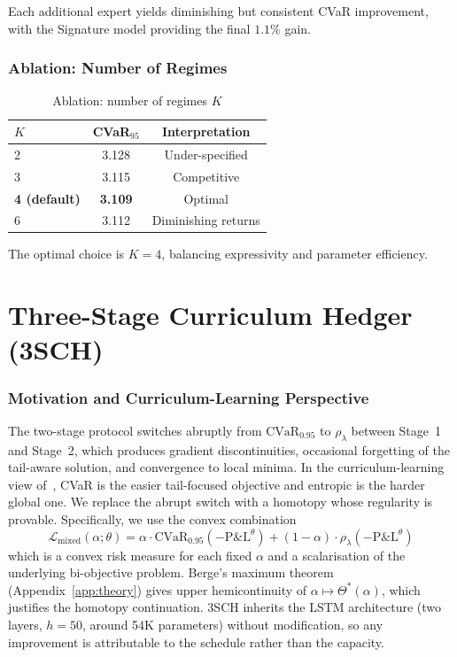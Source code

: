 \documentclass[11pt,oneside]{report}
\newcommand{\cvar}{\mathrm{CVaR}}
\begin{document}
Each additional expert yields diminishing but consistent CVaR improvement, with the Signature model providing the final $1.1\%$ gain.


\subsubsection{Ablation: Number of Regimes}

\begin{table}[htbp]
\centering
\caption{Ablation: number of regimes $K$}
\label{tab:ablation_regimes}
\small
\begin{tabular}{lcc}
\toprule
\textbf{$K$} & \textbf{CVaR$_{95}$} & \textbf{Interpretation} \\
\midrule
2 & 3.128 & Under-specified \\
3 & 3.115 & Competitive \\
\textbf{4 (default)} & \textbf{3.109} & Optimal \\
6 & 3.112 & Diminishing returns \\
\bottomrule
\end{tabular}
\end{table}

The optimal choice is $K=4$, balancing expressivity and parameter efficiency.


\section{Three-Stage Curriculum Hedger (3SCH)}
\label{sec:3sch}

\subsubsection{Motivation and Curriculum-Learning Perspective}

The two-stage \citet{kozyra2019deep} protocol switches abruptly from $\cvar_{0.95}$ to $\rho_\lambda$ between Stage~1 and Stage~2, which produces gradient discontinuities, occasional forgetting of the tail-aware solution, and convergence to local minima. In the curriculum-learning view of~\citet{bengio2009curriculum}, CVaR is the easier tail-focused objective and entropic is the harder global one. We replace the abrupt switch with a homotopy whose regularity is provable. Specifically, we use the convex combination
\begin{equation}
    \mathcal{L}_{\mathrm{mixed}}(\alpha; \theta) = \alpha \cdot \cvar_{0.95}(-\mathrm{P\&L}^\theta) + (1-\alpha) \cdot \rho_\lambda(-\mathrm{P\&L}^\theta)
\end{equation}
which is a convex risk measure for each fixed $\alpha$ and a scalarisation of the underlying bi-objective problem. Berge's maximum theorem~\cite{berge1963topological,aliprantis2006infinite} (Appendix~\ref{app:theory}) gives upper hemicontinuity of $\alpha\mapsto\Theta^*(\alpha)$, which justifies the homotopy continuation. 3SCH inherits the LSTM architecture (two layers, $h=50$, around 54K parameters) without modification, so any improvement is attributable to the schedule rather than the capacity.
\end{document}
